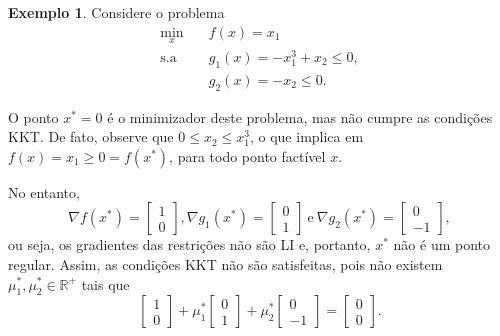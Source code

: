 \documentclass[12pt,a4paper]{scrartcl}
\def\RR{\mathds{R}}
\theoremstyle{definition}%
\newtheorem{exem}{Exemplo}
\newtheorem{defi}{Definição}
\begin{document}
\begin{exem}
Considere o problema 
\[
\begin{aligned}
\min_{x} & \quad f(x)=x_{1} \\
\text{s.a} & \quad g_{1}(x)=-x_{1}^{3} + x_{2} \leq 0 , \\
& \quad g_{2}(x) = -x_{2} \leq 0.
\end{aligned}
\]

O ponto $x^{*} = 0$ é o minimizador deste problema, mas não cumpre as condições KKT. De fato, observe que $0\leq x_{2} \leq x_{1}^{3}$, o que implica em $f(x)= x_{1} \geq 0 = f(x^{*})$, para todo ponto factível $x$.

No entanto, 
\[
\nabla f(x^{*}) = \begin{bmatrix*} 1 \\ 0 \end{bmatrix*} , \nabla g_{1}(x^{*}) = \begin{bmatrix*} 0 \\ 1 \end{bmatrix*} \ \text{e} \ \nabla g_{2}(x^{*}) = \begin{bmatrix*} 0 \\ -1 \end{bmatrix*},
\]
ou seja, os gradientes das restrições não são LI e, portanto, $x^{*}$ não é um ponto regular. Assim, as condições KKT não são satisfeitas, pois não existem $\mu_{1}^{*} , \mu_{2}^{*} \in \RR^{+}$ tais que 
\[
\begin{bmatrix*} 1 \\ 0 \end{bmatrix*} + \mu_{1}^{*} \begin{bmatrix*} 0 \\ 1 \end{bmatrix*} + \mu_{2}^{*} \begin{bmatrix*} 0 \\ -1 \end{bmatrix*} = \begin{bmatrix*} 0 \\ 0 \end{bmatrix*}.
\]
\end{exem}



\end{document}
